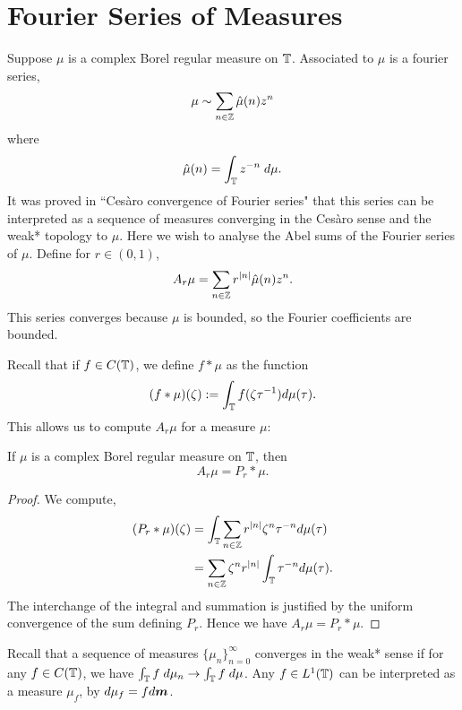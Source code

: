 \section{Fourier Series of Measures}
Suppose $\mu$ is a complex Borel regular measure on $\mathbb{T}$. Associated
to $\mu$ is a fourier series,
\begin{equation*}
    \mu \sim \sum_{n \in \mathbb{Z}} \hat{\mu}(n) z^n
\end{equation*}
where
\begin{equation*}
    \hat{\mu}(n) = \int_{\mathbb{T}} z^{-n} \;d\mu.
\end{equation*}
It was proved in ``Ces\`aro convergence of Fourier series" that this series
can be interpreted as a sequence of measures converging in the Ces\`aro sense
and the weak* topology to $\mu$. Here we wish to analyse the Abel sums of the 
Fourier series of $\mu$. 
Define for $r \in (0,1)$,
\begin{equation*}
    A_r \mu = \sum_{n \in \mathbb{Z}} r^{|n|} \hat{\mu}(n) z^n.
\end{equation*}
This series converges because $\mu$ is bounded, so the Fourier coefficients 
are bounded.

Recall that if $f \in C(\mathbb{T})$, we define $f*\mu$ as the function
\begin{equation*}
    (f*\mu)(\zeta) := \int_{\mathbb{T}} f(\zeta \tau^{-1})d\mu(\tau).
\end{equation*}
This allows us to compute $A_r\mu$ for a measure $\mu$:
\begin{proposition}
    If $\mu$ is a complex Borel regular measure on $\mathbb{T}$, then
    \begin{equation*}
        A_r \mu = P_r * \mu.
    \end{equation*}
\end{proposition}
\begin{proof}
    We compute,
    \begin{align*}
        (P_r * \mu)(\zeta) &= \int_{\mathbb{T}} \sum_{n \in \mathbb{Z}} r^{|n|} \zeta^n \tau^{-n} d\mu(\tau)\\
        &= \sum_{n \in \mathbb{Z}} \zeta^nr^{|n|}\int_{\mathbb{T}} \tau^{-n} d\mu(\tau).
    \end{align*}
    The interchange of the integral and summation is justified by the uniform convergence
    of the sum defining $P_r$. Hence we have $A_r \mu = P_r * \mu$. 
\end{proof} 

Recall that a sequence of measures $\{\mu_n\}_{n=0}^\infty$ converges
in the weak* sense if for any $f \in C(\mathbb{T})$, 
we have $\int_{\mathbb{T}} f\;d\mu_n \rightarrow \int_{\mathbb{T}} f\;d\mu$.
Any $f \in L^1(\mathbb{T})$ can be interpreted as a measure $\mu_f$, by $d\mu_f = fd\boldsymbol{m}$. 

